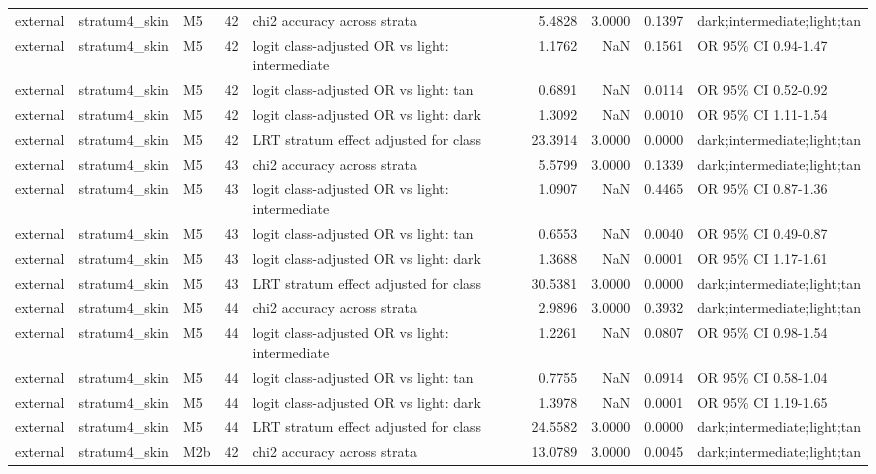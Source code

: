 \begin{tabular}{lllrlrrrl}
external & stratum4\_skin & M5 & 42 & chi2 accuracy across strata & 5.4828 & 3.0000 & 0.1397 & dark;intermediate;light;tan \\
external & stratum4\_skin & M5 & 42 & logit class-adjusted OR vs light: intermediate & 1.1762 & NaN & 0.1561 & OR 95\% CI 0.94-1.47 \\
external & stratum4\_skin & M5 & 42 & logit class-adjusted OR vs light: tan & 0.6891 & NaN & 0.0114 & OR 95\% CI 0.52-0.92 \\
external & stratum4\_skin & M5 & 42 & logit class-adjusted OR vs light: dark & 1.3092 & NaN & 0.0010 & OR 95\% CI 1.11-1.54 \\
external & stratum4\_skin & M5 & 42 & LRT stratum effect adjusted for class & 23.3914 & 3.0000 & 0.0000 & dark;intermediate;light;tan \\
external & stratum4\_skin & M5 & 43 & chi2 accuracy across strata & 5.5799 & 3.0000 & 0.1339 & dark;intermediate;light;tan \\
external & stratum4\_skin & M5 & 43 & logit class-adjusted OR vs light: intermediate & 1.0907 & NaN & 0.4465 & OR 95\% CI 0.87-1.36 \\
external & stratum4\_skin & M5 & 43 & logit class-adjusted OR vs light: tan & 0.6553 & NaN & 0.0040 & OR 95\% CI 0.49-0.87 \\
external & stratum4\_skin & M5 & 43 & logit class-adjusted OR vs light: dark & 1.3688 & NaN & 0.0001 & OR 95\% CI 1.17-1.61 \\
external & stratum4\_skin & M5 & 43 & LRT stratum effect adjusted for class & 30.5381 & 3.0000 & 0.0000 & dark;intermediate;light;tan \\
external & stratum4\_skin & M5 & 44 & chi2 accuracy across strata & 2.9896 & 3.0000 & 0.3932 & dark;intermediate;light;tan \\
external & stratum4\_skin & M5 & 44 & logit class-adjusted OR vs light: intermediate & 1.2261 & NaN & 0.0807 & OR 95\% CI 0.98-1.54 \\
external & stratum4\_skin & M5 & 44 & logit class-adjusted OR vs light: tan & 0.7755 & NaN & 0.0914 & OR 95\% CI 0.58-1.04 \\
external & stratum4\_skin & M5 & 44 & logit class-adjusted OR vs light: dark & 1.3978 & NaN & 0.0001 & OR 95\% CI 1.19-1.65 \\
external & stratum4\_skin & M5 & 44 & LRT stratum effect adjusted for class & 24.5582 & 3.0000 & 0.0000 & dark;intermediate;light;tan \\
external & stratum4\_skin & M2b & 42 & chi2 accuracy across strata & 13.0789 & 3.0000 & 0.0045 & dark;intermediate;light;tan \\

\end{tabular}
